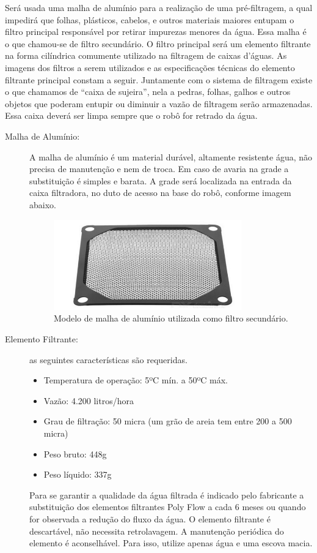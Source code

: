 Será usada uma malha de alumínio para a realização de uma pré-filtragem, a qual impedirá que folhas, plásticos, cabelos, e outros materiais maiores entupam o filtro principal responsável por retirar impurezas menores da água. Essa malha é o que chamou-se de filtro secundário. O filtro principal será um elemento filtrante na forma cilíndrica comumente utilizado na filtragem de caixas d’águas. As imagens dos filtros a serem utilizados e as especificações técnicas do elemento filtrante principal constam a seguir. Juntamente com o sistema de filtragem existe o que chamamos de “caixa de sujeira”, nela a pedras, folhas, galhos e outros objetos que poderam entupir ou diminuir a vazão de filtragem serão armazenadas. Essa caixa deverá ser limpa sempre que o robô for retrado da água.
\begin{description}
\item[Malha de Alumínio:] A malha de alumínio é um material durável, altamente resistente água, não precisa de manutenção e nem de troca. Em caso de avaria na grade a substituição é simples e barata. A grade será localizada na entrada da caixa filtradora, no duto de acesso na base do robô, conforme imagem abaixo.
\par
  \begin{figure}[h]
    \centering
    \includegraphics[width=0.8\textwidth]{figures/mesh-aluminium.png}
    \caption{Modelo de malha de alumínio utilizada como filtro secundário.}
    \label{fig:mesh-aluminium}
  \end{figure}
  \FloatBarrier
\par
\item[Elemento Filtrante:] as seguintes características são requeridas.

\begin{itemize}
\item Temperatura de operação: 5ºC mín. a 50ºC máx.
\item Vazão: 4.200 litros/hora
\item Grau de filtração: 50 micra (um grão de areia tem entre 200 a 500 micra)
\item Peso bruto: 448g
\item Peso líquido: 337g
\end{itemize}
Para se garantir a qualidade da água filtrada é indicado pelo fabricante a substituição dos elementos filtrantes Poly Flow a cada 6 meses ou quando for observada a redução do fluxo da água. O elemento filtrante é descartável, não necessita retrolavagem. A manutenção periódica do elemento é aconselhável. Para isso, utilize apenas água e uma escova macia.


\end{description}

